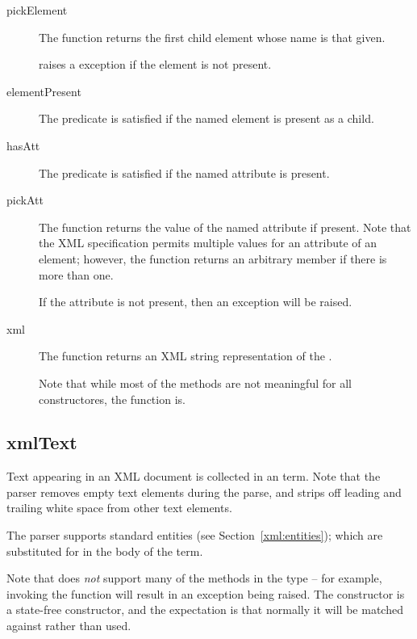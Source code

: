 \begin{description}
\item[pickElement]
The  function returns the first child element whose name is that given.

 raises a  exception if the element is not present.

\item[elementPresent]
The  predicate is satisfied if the named element is present as a child.

\item[hasAtt]
The  predicate is satisfied if the named attribute is present.

\item[pickAtt]
The  function returns the value of the named attribute if present. Note that the XML specification permits multiple values for an attribute of an element; however, the  function returns an arbitrary member if there is more than one.

If the attribute is not present, then an  exception will be raised.

\item[xml]
The  function returns an XML string representation of the . 

Note that while most of the methods are not meaningful for all  constructores, the  function is.
\end{description}


\subsection{xmlText}
\label{xml:xmltext}
Text appearing in an XML document is collected in an  term. Note that the parser removes empty text elements during the parse, and strips off leading and trailing white space from other text elements.

The parser supports standard entities (see Section~\vref{xml:entities}); which are substituted for in the body of the  term.

Note that  does \emph{not} support many of the methods in the  type -- for example, invoking the  function will result in an  exception being raised. The  constructor is a state-free constructor, and the expectation is that normally it will be matched against rather than used.

